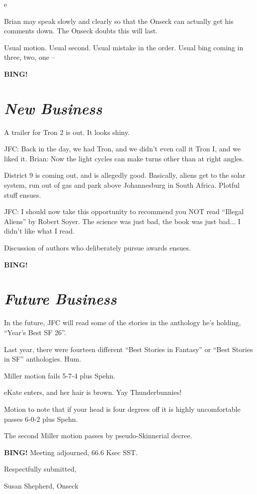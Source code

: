 e\documentclass[10pt]{article}
\newcommand{\bing}{{\bf BING!} }
\newcommand{\goto}[1]{\bing \vskip 12pt \section*{{\em{#1}}}}
\newcommand{\ps}{ plus Spehn\xspace}
\begin{document}
Brian may speak slowly and clearly so that the Onseck can actually get his comments down. The Onseck doubts this will last.

Usual motion. Usual second. Usual mistake in the order. Usual bing coming in three, two, one --

\goto{New Business}
A trailer for Tron 2 is out. It looks shiny.

JFC: Back in the day, we had Tron, and we didn't even call it Tron I, and we liked it.
Brian: Now the light cycles can make turns other than at right angles.

District 9 is coming out, and is allegedly good. Basically, aliens get to the solar system, run out of gas and park above Johannesburg in South Africa. Plotful stuff ensues.

JFC: I should now take this opportunity to recommend you NOT read ``Illegal Aliens'' by Robert Soyer. The science was just bad, the book was just bad... I didn't like what I read.

Discussion of authors who deliberately pursue awards ensues.

\goto{Future Business}

In the future, JFC will read some of the stories in the anthology he's holding, ``Year's Best SF 26''.

Last year, there were fourteen different ``Best Stories in Fantasy'' or ``Best Stories in SF'' anthologies. Hum.

Miller motion fails 5-7-4\ps.

eKate enters, and her hair is brown. Yay Thunderbunnies!

Motion to note that if your head is four degrees off it is highly uncomfortable passes 6-0-2\ps.

The second Miller motion passes by pseudo-Skinnerial decree.

\bing
\noindent
Meeting adjourned, 66.6 Ksec SST.

\vspace{18pt}

\centerline{Respectfully submitted,}
\centerline{Susan Shepherd, Onseck}
\end{document}
